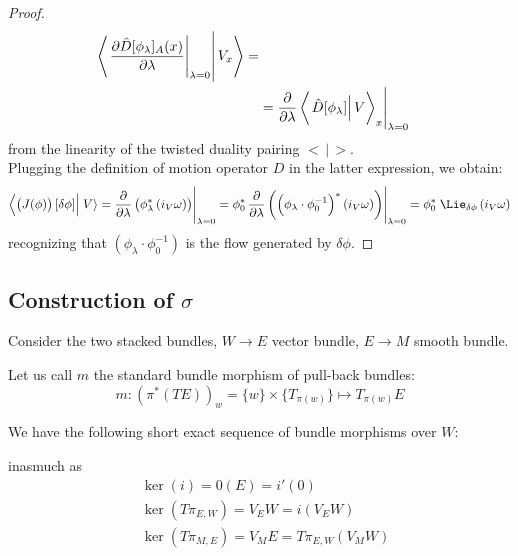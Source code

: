 \documentclass[a4paper,12pt,fleqn]{scrartcl}  %
\begin{document}
\begin{proof}
\begin{align*}
		\left\langle\left.		
		\eval{\dfrac{\partial \hat{D}[\phi_\lambda]_A(x)}{\partial \lambda}}_{\lambda=0}
		\right\vert
		 V_x \right\rangle = \\
		 &=
		 \eval{
		 	\dfrac{\partial}{\partial \lambda}
		\left\langle\left.			 	
		 	\hat{D}[\phi_\lambda]
		 			\right\vert
		 V \right\rangle _x
		 }_{\lambda=0}
	\end{align*}
	from the linearity of the twisted duality pairing $<\,|\,>$.\\
	Plugging  the definition of motion operator $D$ in the latter expression, we obtain:
	\begin{displaymath}
				\left\langle \left(J(\phi) \right) [\delta \phi] \right\vert
		\left. V \right\rangle =
		 \eval{
		 	\dfrac{\partial}{\partial \lambda}
				\left(
					\phi^\ast_\lambda \left( i_V \omega \right) \right)
		 }_{\lambda=0}	=
		 \phi_0^\ast
		 \eval{
				\dfrac{\partial}{\partial \lambda}
				\left(
			 		\left(\phi_\lambda \cdot \phi_0^{-1}\right)^\ast
					\left( i_V \omega \right) \right)
		 }_{\lambda=0}	=
		 		\phi_0^\ast \; \Lie_{\delta \phi} \left( i_V \omega \right)
	\end{displaymath}
	recognizing that $\left(\phi_\lambda \cdot \phi_0^{-1}\right)$ is the flow generated by $\delta \phi$.
\end{proof}

\newpage
\subsection{Construction of $\sigma$}\label{Section:sigma}
Consider the two stacked bundles, $ W \rightarrow E$ vector bundle, $E \rightarrow M$ smooth bundle.
	\begin{center}
	  
	\end{center}
%
Let us call $m$ the standard bundle morphism of pull-back bundles:
\begin{displaymath}
	m : \left( \pi^\ast \left( T E \right) \right)_w = \{w\} \times \{T_{\pi(w)} \} \mapsto T_{\pi(w)} E
\end{displaymath}

We have the following short exact sequence of bundle morphisms over $W$:
	\begin{center}
	  
	\end{center}
inasmuch as
%
\begin{align*}
	&\ker(i) = 0 (E) = i' \left( 0 \right) \\
	&\ker\left( T \pi_{E,W} \right) = V_E W = i\left( V_E W \right) \\
	&\ker\left(T \pi_{M,E}\right) = V_M E = T \pi_{E,W} \left( V_M W \right) \\
\end{align*}
\end{document}
